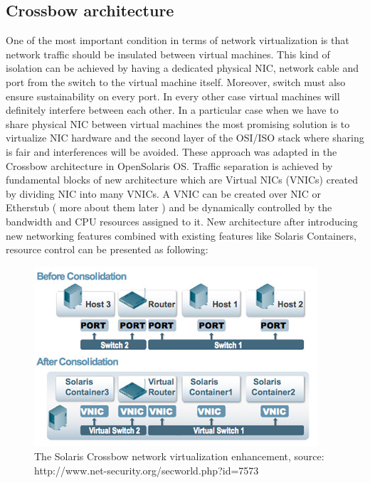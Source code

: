 \documentclass[11pt]{book}
\begin{document}
                \subsection{Crossbow architecture}

                One of the most important condition in terms of network virtualization is that network traffic
              should be insulated between virtual machines. This kind of isolation can be achieved by having
              a dedicated physical NIC, network cable and port from the switch to the virtual machine
              itself. Moreover, switch must also ensure sustainability on every port. In every other case
              virtual machines will definitely interfere between each other.
                In a particular case when we have to share physical NIC between virtual machines the most promising solution is to
              virtualize NIC hardware and the second layer of the OSI/ISO stack where sharing is fair and
              interferences will be avoided. These approach was adapted in the Crossbow architecture in
              OpenSolaris OS.
                Traffic separation is achieved by fundamental blocks of new architecture
              which are Virtual NICs (VNICs) created by dividing NIC into many VNICs. 
                A VNIC can be created over NIC or Etherstub ( more about them later ) and be dynamically controlled by the
              bandwidth and CPU resources assigned to it. New architecture after introducing new networking features combined with existing features
              like Solaris Containers, resource control can be presented as following:

               \begin{figure}[H]
			\includegraphics[width=\textwidth]{img/crossbow.jpg}
			\caption{The Solaris Crossbow network virtualization enhancement, source: http://www.net-security.org/secworld.php?id=7573}
		\end{figure}
\end{document}
